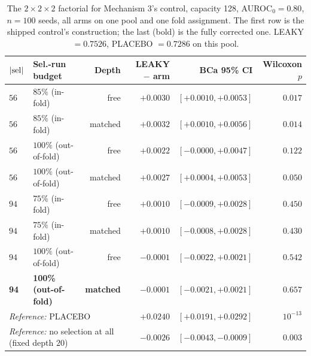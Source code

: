 \documentclass[10pt]{article} %
\begin{document}
\begin{table}[!ht]
\centering
\small
\begin{tabular}{llrrrr}
\toprule
$|{\rm sel}|$ & Sel.-run budget & Depth & LEAKY $-$ arm & BCa 95\% CI & Wilcoxon $p$ \\
\midrule
$56$ & $85\%$ (in-fold) & free & $+0.0030$ & $[+0.0010,+0.0053]$ & $0.017$ \\
$56$ & $85\%$ (in-fold) & matched & $+0.0032$ & $[+0.0010,+0.0056]$ & $0.014$ \\
$56$ & $100\%$ (out-of-fold) & free & $+0.0022$ & $[-0.0000,+0.0047]$ & $0.122$ \\
$56$ & $100\%$ (out-of-fold) & matched & $+0.0027$ & $[+0.0004,+0.0053]$ & $0.050$ \\
$94$ & $75\%$ (in-fold) & free & $+0.0010$ & $[-0.0009,+0.0028]$ & $0.450$ \\
$94$ & $75\%$ (in-fold) & matched & $+0.0010$ & $[-0.0008,+0.0028]$ & $0.430$ \\
$94$ & $100\%$ (out-of-fold) & free & $-0.0001$ & $[-0.0022,+0.0021]$ & $0.542$ \\
\textbf{94} & \textbf{100\% (out-of-fold)} & \textbf{matched} & $\mathbf{-0.0001}$ &
  $\mathbf{[-0.0021,+0.0021]}$ & $\mathbf{0.657}$ \\
\midrule
\multicolumn{3}{l}{\emph{Reference:} PLACEBO} & $+0.0240$ & $[+0.0191,+0.0292]$ & $10^{-13}$ \\
\multicolumn{3}{l}{\emph{Reference:} no selection at all (fixed depth $20$)} &
  $-0.0026$ & $[-0.0043,-0.0009]$ & $0.003$ \\
\bottomrule
\end{tabular}
\caption{The $2\times2\times2$ factorial for Mechanism 3's control, capacity 128,
AUROC$_0=0.80$, $n=100$ seeds, all arms on one pool and one fold assignment. The
first row is the shipped control's construction; the last (bold) is the fully
corrected one. LEAKY $=0.7526$, PLACEBO $=0.7286$ on this pool.}
\label{tab:m3-factorial}
\end{table}
\end{document}
